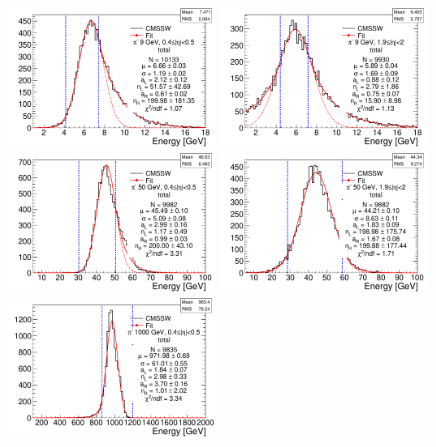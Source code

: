 \begin{figure}[hbtp]
\begin{center}
\includegraphics[width=0.49\textwidth]{figures/pion_response_tot_cballD_9gev_ieta5.pdf}
\includegraphics[width=0.49\textwidth]{figures/pion_response_tot_cballD_9gev_ieta20.pdf}
\includegraphics[width=0.49\textwidth]{figures/pion_response_tot_cballD_50gev_ieta5.pdf}
\includegraphics[width=0.49\textwidth]{figures/pion_response_tot_cballD_50gev_ieta20.pdf}
\includegraphics[width=0.49\textwidth]{figures/pion_response_tot_cballD_1000gev_ieta5.pdf}

\end{center}
\end{figure}
